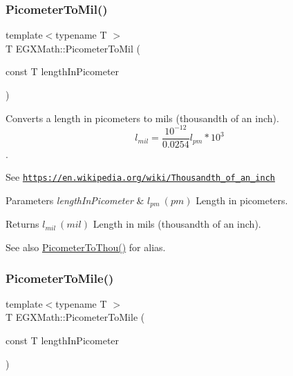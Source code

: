 \subsubsection{\texorpdfstring{Picometer\+To\+Mil()}{PicometerToMil()}}
{\footnotesize\ttfamily template$<$typename T $>$ \\
T E\+G\+X\+Math\+::\+Picometer\+To\+Mil (\begin{DoxyParamCaption}\item[{const T}]{length\+In\+Picometer }\end{DoxyParamCaption})}



Converts a length in picometers to mils (thousandth of an inch). \[ l_{mil}= \frac{10^{-12}}{0.0254} l_{pm} * 10^{3} \]. 

See \href{https://en.wikipedia.org/wiki/Thousandth_of_an_inch}{\tt https\+://en.\+wikipedia.\+org/wiki/\+Thousandth\+\_\+of\+\_\+an\+\_\+inch} 
\begin{DoxyParams}{Parameters}
{\em length\+In\+Picometer} & $ l_{pm}\ (pm)$ Length in picometers. \\
\hline
\end{DoxyParams}
\begin{DoxyReturn}{Returns}
$ l_{mil}\ (mil)$ Length in mils (thousandth of an inch). 
\end{DoxyReturn}
\begin{DoxySeeAlso}{See also}
\mbox{\hyperlink{group___e_g_x_math-_conversions-_length_conversions-_picometer-_imperial_gabf48007bf90e25f6d23f847101fd35f1}{Picometer\+To\+Thou()}} for alias. 
\end{DoxySeeAlso}
\mbox{\label{group___e_g_x_math-_conversions-_length_conversions-_picometer-_imperial_gae153bd94c8377dd95b8b09bcc56256b0}} 
\subsubsection{\texorpdfstring{Picometer\+To\+Mile()}{PicometerToMile()}}
{\footnotesize\ttfamily template$<$typename T $>$ \\
T E\+G\+X\+Math\+::\+Picometer\+To\+Mile (\begin{DoxyParamCaption}\item[{const T}]{length\+In\+Picometer }\end{DoxyParamCaption})}



